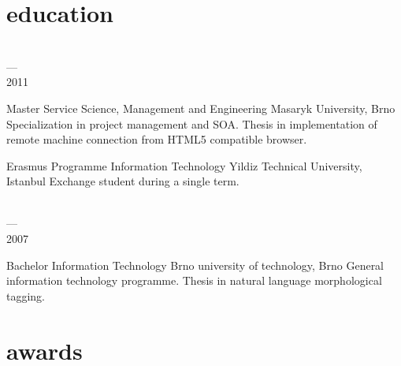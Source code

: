 \documentclass[]{friggeri-cv} %
\begin{document}
    \pagebreak



    \section{education}

    \begin{entrylist}
        \entry
        {\parbox[t]{2cm}{ \\ --- \\ 2011}}
        {Master {\normalfont Service Science, Management and Engineering}}
        {Masaryk University, Brno}
        {
            \thesis
            {Specialization in project management and SOA.}
            {Thesis in implementation of remote machine connection from HTML5 compatible browser.}
        }
        \entry
        {\parbox[t]{2cm}{}}
        {Erasmus Programme {\normalfont Information Technology}}
        {Yildiz Technical University, Istanbul}
        {Exchange student during a single term.\medskip}
        \entry
        {\parbox[t]{2cm}{ \\ --- \\ 2007}}
        {Bachelor {\normalfont Information Technology}}
        {Brno university of technology, Brno}
        {
            \thesis
            {General information technology programme.}
            {Thesis in natural language morphological tagging.}
        }
    \end{entrylist}



    \section{awards}
\end{document}
